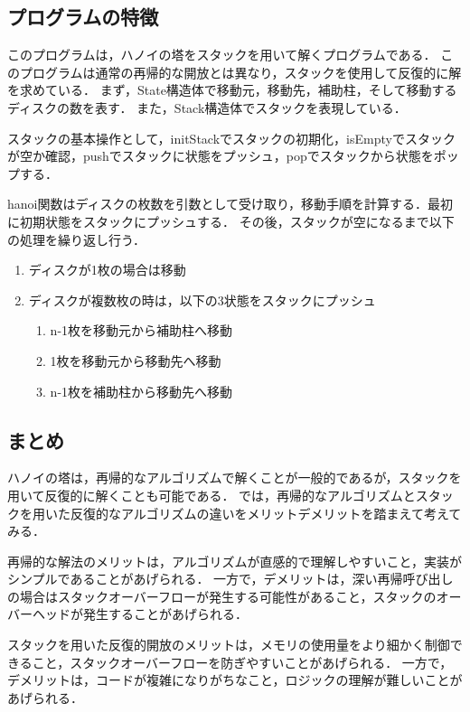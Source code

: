 \documentclass{ltjsarticle}
\begin{document}
\subsection{プログラムの特徴}
このプログラムは，ハノイの塔をスタックを用いて解くプログラムである．
このプログラムは通常の再帰的な開放とは異なり，スタックを使用して反復的に解を求めている．
まず，State構造体で移動元，移動先，補助柱，そして移動するディスクの数を表す．
また，Stack構造体でスタックを表現している．

スタックの基本操作として，initStackでスタックの初期化，isEmptyでスタックが空か確認，pushでスタックに状態をプッシュ，popでスタックから状態をポップする．

hanoi関数はディスクの枚数を引数として受け取り，移動手順を計算する．最初に初期状態をスタックにプッシュする．
その後，スタックが空になるまで以下の処理を繰り返し行う．

\begin{enumerate}
    \item ディスクが1枚の場合は移動
    \item ディスクが複数枚の時は，以下の3状態をスタックにプッシュ
    \begin{enumerate}
        \item n-1枚を移動元から補助柱へ移動
        \item 1枚を移動元から移動先へ移動
        \item n-1枚を補助柱から移動先へ移動
    \end{enumerate}
\end{enumerate}

\subsection{まとめ}
ハノイの塔は，再帰的なアルゴリズムで解くことが一般的であるが，スタックを用いて反復的に解くことも可能である．
では，再帰的なアルゴリズムとスタックを用いた反復的なアルゴリズムの違いをメリットデメリットを踏まえて考えてみる．

再帰的な解法のメリットは，アルゴリズムが直感的で理解しやすいこと，実装がシンプルであることがあげられる．
一方で，デメリットは，深い再帰呼び出しの場合はスタックオーバーフローが発生する可能性があること，スタックのオーバーヘッドが発生することがあげられる．

スタックを用いた反復的開放のメリットは，メモリの使用量をより細かく制御できること，スタックオーバーフローを防ぎやすいことがあげられる．
一方で，デメリットは，コードが複雑になりがちなこと，ロジックの理解が難しいことがあげられる．
\end{document}
